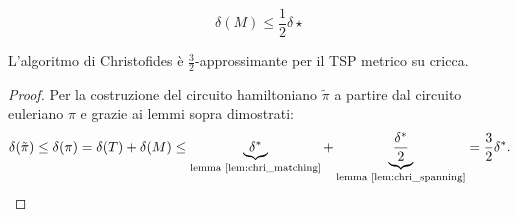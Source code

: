 \begin{lemma}\label{lem:chri_matching}
	\begin{equation*}
		\delta(M) \leq \frac 1 2 \delta\star
	\end{equation*}
\end{lemma}

\begin{theorem}
	L'algoritmo di Christofides è $\frac 3 2$-approssimante per il TSP metrico su cricca.
\end{theorem}
\begin{proof}
	Per la costruzione del circuito hamiltoniano $\tilde\pi$ a partire dal circuito euleriano $\pi$ e grazie ai lemmi sopra dimostrati:
	\begin{equation*}
		\delta(\tilde\pi)\leq\delta(\pi) = \delta(T)+\delta(M)\leq
		\underbrace{\delta\star}_{\text{lemma \ref{lem:chri_matching}}} + \underbrace{\frac{\delta\star}{2}}_{\text{lemma \ref{lem:chri_spanning}}} =
		\frac 3 2 \delta\star \text.
	\end{equation*}
\end{proof}

